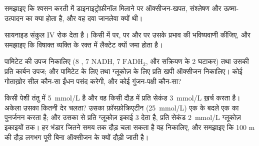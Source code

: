 \begin{exercise}[$\star\star$]\label{exo:b1:respiration-fermentation:8}
समझाइए कि श्वसन करती  में डाइनाइट्रोफ़ीनॉल मिलाने पर
ऑक्सीजन-खपत,  संश्लेषण और ऊष्मा-उत्पादन का क्या होता है, और वह दवा
जानलेवा क्यों थी।
\end{exercise}

\begin{exercise}[$\star\star$]\label{exo:b1:respiration-fermentation:9}
सायनाइड संकुल IV रोक देता है। किसी  में  पर,  पर और  पर उसके प्रभाव की भविष्यवाणी कीजिए, और समझाइए कि
विषाक्त व्यक्ति के रक्त में लैक्टेट क्यों जमा होता है।
\end{exercise}

\begin{exercise}[$\star\star\star$]\label{exo:b1:respiration-fermentation:10}
पामिटेट की  उपज निकालिए (8 , 7 NADH, 7
$\mathrm{FADH_2}$, और सक्रियण के 2  घटाकर) तथा उसकी प्रति कार्बन उपज;
और पामिटेट के लिए तथा ग्लूकोज़ के लिए प्रति  खपी ऑक्सीजन निकालिए।
कोई गोताख़ोर सील कौन-सा ईंधन पसंद करेगी, और कोई गुंजन-पक्षी कौन-सा?
\end{exercise}

\begin{exercise}[$\star\star\star$]\label{exo:b1:respiration-fermentation:11}
किसी पेशी तंतु में \qty{5}{mmol/L}  है और वह किसी दौड़ में प्रति
सेकंड \qty{3}{mmol/L} ख़र्च करता है। अकेला उसका  कितनी देर चलता?
उसका फ़ॉस्फ़ोक्रिएटीन (\qty{25}{mmol/L}) एक के बदले एक  का पुनर्जनन
करता है; और उसका   से प्रति ग्लूकोज़ इकाई 3  देता है,
प्रति सेकंड \qty{2}{mmol/L} ग्लूकोज़ इकाइयों तक। हर भंडार जितने समय तक
दौड़ चला सकता है वह निकालिए, और समझाइए कि 100 m की दौड़ लगभग पूरी बिना
ऑक्सीजन के क्यों दौड़ी जाती है।
\end{exercise}

